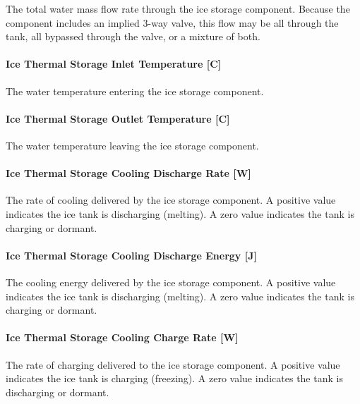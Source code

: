 The total water mass flow rate through the ice storage component. Because the component includes an implied 3-way valve, this flow may be all through the tank, all bypassed through the valve, or a mixture of both.

\paragraph{Ice Thermal Storage Inlet Temperature {[}C{]}}\label{ice-thermal-storage-inlet-temperature-c}

The water temperature entering the ice storage component.

\paragraph{Ice Thermal Storage Outlet Temperature {[}C{]}}\label{ice-thermal-storage-outlet-temperature-c}

The water temperature leaving the ice storage component.

\paragraph{Ice Thermal Storage Cooling Discharge Rate {[}W{]}}\label{ice-thermal-storage-cooling-discharge-rate-w}

The rate of cooling delivered by the ice storage component. A positive value indicates the ice tank is discharging (melting). A zero value indicates the tank is charging or dormant.

\paragraph{Ice Thermal Storage Cooling Discharge Energy {[}J{]}}\label{ice-thermal-storage-cooling-discharge-energy-j}

The cooling energy delivered by the ice storage component. A positive value indicates the ice tank is discharging (melting). A zero value indicates the tank is charging or dormant.

\paragraph{Ice Thermal Storage Cooling Charge Rate {[}W{]}}\label{ice-thermal-storage-cooling-charge-rate-w}

The rate of charging delivered to the ice storage component. A positive value indicates the ice tank is charging (freezing). A zero value indicates the tank is discharging or dormant.

